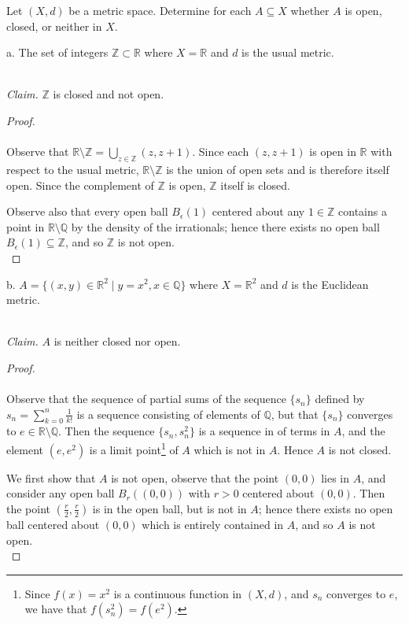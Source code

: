 Let $(X, d)$ be a metric space. Determine for each $A \subseteq X$ whether $A$ is open, closed, or neither in $X$.

a.  The set of integers $\mathbb{Z} \subset \mathbb{R}$ where $X = \mathbb{R}$ and $d$ is the usual metric.

\ \\
\emph{Claim.} $\mathbb{Z}$ is closed and not open.

\begin{proof}\renewcommand{\qedsymbol}{}\ \\\\
    Observe that $\mathbb{R} \setminus \mathbb{Z} = \bigcup\limits_{z \in \mathbb{Z}}{(z, z + 1)}$. Since each 
    $(z, z + 1)$ is open in $\mathbb{R}$ with respect to the usual metric, $\mathbb{R} \setminus \mathbb{Z}$ is the
    union of open sets and is therefore itself open. Since the complement of $\mathbb{Z}$ is open, $\mathbb{Z}$ itself
    is closed.

    Observe also that every open ball $B_\epsilon(1)$ centered about any $1 \in \mathbb{Z}$ contains a point in 
    $\mathbb{R} \setminus \mathbb{Q}$ by the density of the irrationals; hence there exists no open ball 
    $B_\epsilon(1) \subseteq \mathbb{Z}$, and so $\mathbb{Z}$ is not open.
    \ \\
\end{proof}

\pagebreak

b.  $A = \{(x, y) \in \mathbb{R}^2 \mid y=x^2, x \in \mathbb{Q} \}$ where $X = \mathbb{R}^2$ and $d$ is the Euclidean
     metric.

\ \\
\emph{Claim.} $A$ is neither closed nor open.

\begin{proof}\ \\\\
    Observe that the sequence of partial sums of the sequence $\{s_n\}$ defined by 
    $s_n = \sum\limits_{k = 0}^{n}{\frac{1}{k!}}$ is a sequence consisting of elements of $\mathbb{Q}$, but that
    $\{s_n\}$ converges to $e \in \mathbb{R} \setminus \mathbb{Q}$. Then the sequence $\{s_n, s_n^2\}$ is a sequence in
    of terms in $A$, and the element $(e, e^2)$ is a limit point\footnote{
        Since $f(x) = x^2$ is a continuous function in $(X, d)$, and $s_n$ converges to $e$, we have that 
        $f(s_n^2) = f(e^2)$.
    } of $A$ which is not in $A$. Hence $A$ is not closed.

    We first show that $A$ is not open, observe that the point $(0, 0)$ lies in $A$, and consider any open ball 
    $B_r((0, 0))$ with $r > 0$ centered about $(0, 0)$. Then the point $(\frac{r}{2}, \frac{r}{2})$ is in the open ball,
    but is not in $A$; hence there exists no open ball centered about $(0, 0)$ which is entirely contained in $A$, and 
    so $A$ is not open.
    \ \\
\end{proof}

